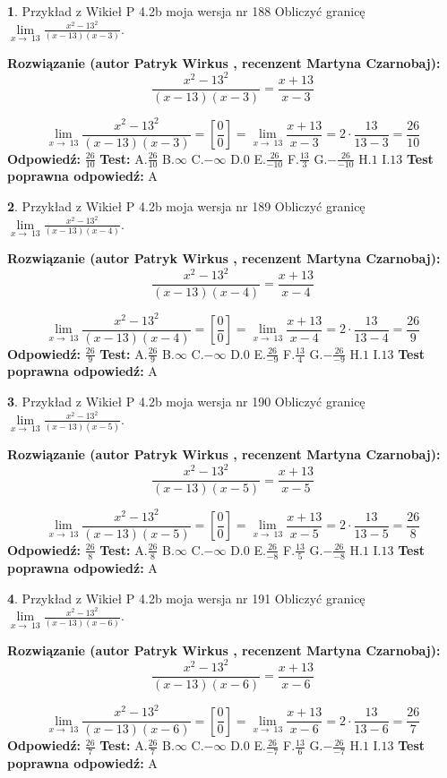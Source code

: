 \documentclass[12pt, a4paper]{article}
\theoremstyle{definition} %
\newtheorem{zad}{}
\newcommand{\zadStart}[1]{\begin{zad}#1\newline}
\newcommand{\zadStop}{\end{zad}}
\newcommand{\rozwStart}[2]{\noindent \textbf{Rozwiązanie (autor #1 , recenzent #2): }\newline}
\newcommand{\rozwStop}{\newline}
\newcommand{\odpStart}{\noindent \textbf{Odpowiedź:}\newline}
\newcommand{\odpStop}{\newline}
\newcommand{\testStart}{\noindent \textbf{Test:}\newline}
\newcommand{\testStop}{\newline}
\newcommand{\kluczStart}{\noindent \textbf{Test poprawna odpowiedź:}\newline}
\newcommand{\kluczStop}{\newline}
\begin{document}
\zadStart{Przykład z Wikieł P 4.2b moja wersja nr 188}
Obliczyć granicę $\lim\limits_{x\to\ 13}\frac{x^{2}-13^{2}}{(x-13)(x-3)}$.
\zadStop
\rozwStart{Patryk Wirkus}{Martyna Czarnobaj}
$$\frac{x^{2}-13^{2}}{(x-13)(x-3)}=\frac{x+13}{x-3}$$

$$\lim\limits_{x\to\ 13}\frac{x^{2}-13^{2}}{(x-13)(x-3)}=[\frac{0}{0}]=\lim\limits_{x\to\ 13}\frac{x+13}{x-3}=2 \cdot \frac{13}{13-3} = \frac{26}{10}$$
\rozwStop
\odpStart
$\frac{26}{10}$
\odpStop
\testStart
A.$\frac{26}{10}$
B.$\infty$
C.$-\infty$
D.$0$
E.$\frac{26}{-10}$
F.$\frac{13}{3}$
G.$-\frac{26}{-10}$
H.$1$
I.$13$
\testStop
\kluczStart
A
\kluczStop



\zadStart{Przykład z Wikieł P 4.2b moja wersja nr 189}
Obliczyć granicę $\lim\limits_{x\to\ 13}\frac{x^{2}-13^{2}}{(x-13)(x-4)}$.
\zadStop
\rozwStart{Patryk Wirkus}{Martyna Czarnobaj}
$$\frac{x^{2}-13^{2}}{(x-13)(x-4)}=\frac{x+13}{x-4}$$

$$\lim\limits_{x\to\ 13}\frac{x^{2}-13^{2}}{(x-13)(x-4)}=[\frac{0}{0}]=\lim\limits_{x\to\ 13}\frac{x+13}{x-4}=2 \cdot \frac{13}{13-4} = \frac{26}{9}$$
\rozwStop
\odpStart
$\frac{26}{9}$
\odpStop
\testStart
A.$\frac{26}{9}$
B.$\infty$
C.$-\infty$
D.$0$
E.$\frac{26}{-9}$
F.$\frac{13}{4}$
G.$-\frac{26}{-9}$
H.$1$
I.$13$
\testStop
\kluczStart
A
\kluczStop



\zadStart{Przykład z Wikieł P 4.2b moja wersja nr 190}
Obliczyć granicę $\lim\limits_{x\to\ 13}\frac{x^{2}-13^{2}}{(x-13)(x-5)}$.
\zadStop
\rozwStart{Patryk Wirkus}{Martyna Czarnobaj}
$$\frac{x^{2}-13^{2}}{(x-13)(x-5)}=\frac{x+13}{x-5}$$

$$\lim\limits_{x\to\ 13}\frac{x^{2}-13^{2}}{(x-13)(x-5)}=[\frac{0}{0}]=\lim\limits_{x\to\ 13}\frac{x+13}{x-5}=2 \cdot \frac{13}{13-5} = \frac{26}{8}$$
\rozwStop
\odpStart
$\frac{26}{8}$
\odpStop
\testStart
A.$\frac{26}{8}$
B.$\infty$
C.$-\infty$
D.$0$
E.$\frac{26}{-8}$
F.$\frac{13}{5}$
G.$-\frac{26}{-8}$
H.$1$
I.$13$
\testStop
\kluczStart
A
\kluczStop



\zadStart{Przykład z Wikieł P 4.2b moja wersja nr 191}
Obliczyć granicę $\lim\limits_{x\to\ 13}\frac{x^{2}-13^{2}}{(x-13)(x-6)}$.
\zadStop
\rozwStart{Patryk Wirkus}{Martyna Czarnobaj}
$$\frac{x^{2}-13^{2}}{(x-13)(x-6)}=\frac{x+13}{x-6}$$

$$\lim\limits_{x\to\ 13}\frac{x^{2}-13^{2}}{(x-13)(x-6)}=[\frac{0}{0}]=\lim\limits_{x\to\ 13}\frac{x+13}{x-6}=2 \cdot \frac{13}{13-6} = \frac{26}{7}$$
\rozwStop
\odpStart
$\frac{26}{7}$
\odpStop
\testStart
A.$\frac{26}{7}$
B.$\infty$
C.$-\infty$
D.$0$
E.$\frac{26}{-7}$
F.$\frac{13}{6}$
G.$-\frac{26}{-7}$
H.$1$
I.$13$
\testStop
\kluczStart
A
\kluczStop
\end{document}
